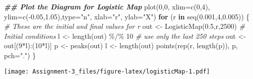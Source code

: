 \documentclass[
]{article}
\newenvironment{Shaded}{\begin{snugshade}}{\end{snugshade}}
\newcommand{\AttributeTok}[1]{\textcolor[rgb]{0.77,0.63,0.00}{#1}}
\newcommand{\CommentTok}[1]{\textcolor[rgb]{0.56,0.35,0.01}{\textit{#1}}}
\newcommand{\ControlFlowTok}[1]{\textcolor[rgb]{0.13,0.29,0.53}{\textbf{#1}}}
\newcommand{\DecValTok}[1]{\textcolor[rgb]{0.00,0.00,0.81}{#1}}
\newcommand{\DocumentationTok}[1]{\textcolor[rgb]{0.56,0.35,0.01}{\textbf{\textit{#1}}}}
\newcommand{\FloatTok}[1]{\textcolor[rgb]{0.00,0.00,0.81}{#1}}
\newcommand{\FunctionTok}[1]{\textcolor[rgb]{0.00,0.00,0.00}{#1}}
\newcommand{\NormalTok}[1]{#1}
\newcommand{\OtherTok}[1]{\textcolor[rgb]{0.56,0.35,0.01}{#1}}
\newcommand{\SpecialCharTok}[1]{\textcolor[rgb]{0.00,0.00,0.00}{#1}}
\newcommand{\StringTok}[1]{\textcolor[rgb]{0.31,0.60,0.02}{#1}}
\begin{document}
\begin{Shaded}
\begin{Highlighting}[]
\DocumentationTok{\#\# Plot the Diagram for Logistic Map}
\FunctionTok{plot}\NormalTok{(}\DecValTok{0}\NormalTok{,}\DecValTok{0}\NormalTok{, }\AttributeTok{xlim=}\FunctionTok{c}\NormalTok{(}\DecValTok{0}\NormalTok{,}\DecValTok{4}\NormalTok{), }\AttributeTok{ylim=}\FunctionTok{c}\NormalTok{(}\SpecialCharTok{{-}}\FloatTok{0.05}\NormalTok{,}\FloatTok{1.05}\NormalTok{),}\AttributeTok{type=}\StringTok{"n"}\NormalTok{, }\AttributeTok{xlab=}\StringTok{"r"}\NormalTok{, }\AttributeTok{ylab=}\StringTok{"X"}\NormalTok{) }
\ControlFlowTok{for}\NormalTok{ (r }\ControlFlowTok{in} \FunctionTok{seq}\NormalTok{(}\FloatTok{0.001}\NormalTok{,}\DecValTok{4}\NormalTok{,}\FloatTok{0.005}\NormalTok{)) \{ }\CommentTok{\# These are the initial and final values for r}
\NormalTok{  out }\OtherTok{\textless{}{-}} \FunctionTok{LogisticMap}\NormalTok{(}\FloatTok{0.5}\NormalTok{,r,}\DecValTok{2500}\NormalTok{) }\CommentTok{\# Initial conditions }
\NormalTok{  l }\OtherTok{\textless{}{-}} \FunctionTok{length}\NormalTok{(out) }\SpecialCharTok{\%/\%} \DecValTok{10} \CommentTok{\# use only the last 250 steps }
\NormalTok{  out }\OtherTok{\textless{}{-}}\NormalTok{ out[(}\DecValTok{9}\SpecialCharTok{*}\NormalTok{l)}\SpecialCharTok{:}\NormalTok{(}\DecValTok{10}\SpecialCharTok{*}\NormalTok{l)] }
\NormalTok{  p }\OtherTok{\textless{}{-}} \FunctionTok{peaks}\NormalTok{(out) }
\NormalTok{  l }\OtherTok{\textless{}{-}} \FunctionTok{length}\NormalTok{(out) }
  \FunctionTok{points}\NormalTok{(}\FunctionTok{rep}\NormalTok{(r, }\FunctionTok{length}\NormalTok{(p)), p, }\AttributeTok{pch=}\StringTok{"."}\NormalTok{)}
\NormalTok{\}}
\end{Highlighting}
\end{Shaded}

\texttt{[image: Assignment-3\_files/figure-latex/logisticMap-1.pdf]}
\end{document}
